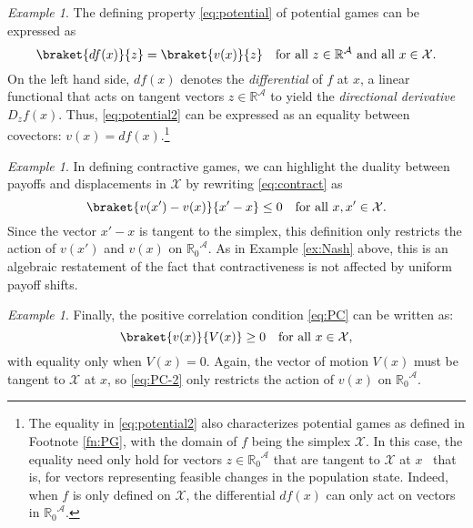 \documentclass[reqno]{amsart}
\theoremstyle{plain}
\theoremstyle{definition}
\theoremstyle{remark}
\newtheorem{example}[theorem]{Example}
\numberwithin{equation}{section}
\numberwithin{theorem}{section}
\begin{document}
\begin{example}
\label{ex:potential2}
The defining property \eqref{eq:potential} of potential games can be expressed as
\begin{equation}
\label{eq:potential2}
\braket{d{f}(x)}{z}
	= \braket{{v}(x)}{z}
	\quad
	\text{for all $z \in {\mathbb{R}}^{\mathcal{A}}$ and all $x\in{\mathcal{X}}$.}
\end{equation}
On the left hand side, $d{f}(x)$ denotes the  \emph{differential} of ${f}$ at $x$, a linear functional that acts on tangent vectors $z\in{\mathbb{R}}^{\mathcal{A}}$ to yield the \emph{directional derivative} $D_{z}{f}(x)$.
Thus, \eqref{eq:potential2} can be expressed as an equality between covectors:
${v}(x) = d{f}(x)$.\footnote{\label{fn:PG2}The equality in \eqref{eq:potential2} also characterizes potential games as defined in Footnote \ref{fn:PG}, with the domain of ${f}$ being the simplex ${\mathcal{X}}$.
In this case, the equality need only hold for vectors $z \in {{\mathbb{R}}_{0}}^{\mathcal{A}}$ that are tangent to ${\mathcal{X}}$ at $x$ \textendash\ that is, for vectors representing feasible changes in the population state.
Indeed, when ${f}$ is only defined on ${\mathcal{X}}$, the differential $d{f}(x)$ can only act on vectors in ${{\mathbb{R}}_{0}}^{\mathcal{A}}$.}
\end{example}

\begin{example}
\label{ex:contract2}
In defining contractive games, we can highlight the duality between payoffs and displacements in ${\mathcal{X}}$ by rewriting \eqref{eq:contract} as 
\begin{equation}
\label{eq:contract2}
\braket{{v}(x') - {v}(x)}{x' - x} 
	\leq 0
	\quad\text{for all $x,x'\in{\mathcal{X}}$.}
\end{equation}
Since the vector $x' - x$ is tangent to the simplex, this definition only restricts the action of ${v}(x')$ and ${v}(x)$ on ${{\mathbb{R}}_{0}}^{\mathcal{A}}$.
As in Example \ref{ex:Nash} above, this is an algebraic restatement of the fact that contractiveness is not affected by uniform payoff shifts.
\end{example}

\begin{example}
Finally, the positive correlation condition \eqref{eq:PC} can be written as: 
\begin{equation}
\label{eq:PC-2}
\braket{{v}(x)}{{V}(x)}
	\geq 0
	\quad
	\text{for all $x \in {\mathcal{X}}$},
\end{equation}
with equality only when ${V}(x)=0$.
Again, the vector of motion ${V}(x)$ must be tangent to ${\mathcal{X}}$ at $x$, so \eqref{eq:PC-2} only restricts the action of ${v}(x)$ on ${{\mathbb{R}}_{0}}^{\mathcal{A}}$. 
\end{example}
\end{document}
